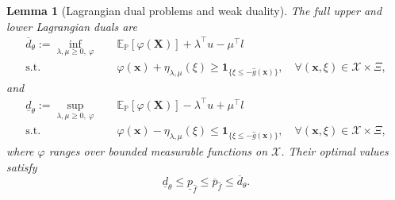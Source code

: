 \documentclass[review,11pt,3p,authoryear,nopreprintline]{elsarticle}
\newtheorem{lemma}{Lemma}
\begin{document}
\begin{lemma}[Lagrangian dual problems and weak duality]
  \label{lem-weak-duality}
  The full upper and lower Lagrangian duals are
  \begin{equation}
    \begin{aligned}
      \overline d_\theta
      :=\inf_{\lambda,\mu\ge0,\ \varphi}\quad&
        \mathbb E_{\mathbb P}[\varphi(\bm X)]
        +\lambda^\top u-\mu^\top l\\
      \text{s.t.}\quad&
        \varphi(\bm x)+\eta_{\lambda,\mu}(\xi)
        \ge\mathbf1_{\{\xi\le -\hat g(\bm x)\}},
        \quad\forall(\bm x,\xi)\in\mathcal X\times\Xi,
    \end{aligned}
    \label{eq-upper-measure-dual}
  \end{equation}
  and
  \begin{equation}
    \begin{aligned}
      \underline d_\theta
      :=\sup_{\lambda,\mu\ge0,\ \varphi}\quad&
        \mathbb E_{\mathbb P}[\varphi(\bm X)]
        -\lambda^\top u+\mu^\top l\\
      \text{s.t.}\quad&
        \varphi(\bm x)-\eta_{\lambda,\mu}(\xi)
        \le\mathbf1_{\{\xi\le -\hat g(\bm x)\}},
        \quad\forall(\bm x,\xi)\in\mathcal X\times\Xi,
    \end{aligned}
    \label{eq-lower-measure-dual}
  \end{equation}
  where $\varphi$ ranges over bounded measurable functions on $\mathcal X$. Their optimal values satisfy
  \begin{equation}
    \underline d_\theta
    \le\underline p_{\hat f}\le\overline p_{\hat f}
    \le\overline d_\theta.
    \label{eq-weak-duality}
  \end{equation}
\end{lemma}
\end{document}
